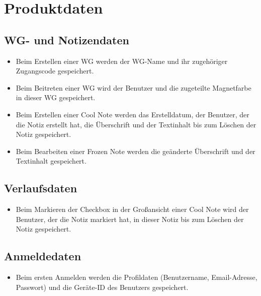 \documentclass[a4paper]{scrreprt}
\begin{document}
    \chapter{Produktdaten}
        \section{WG- und Notizendaten}
        \begin{itemize}
        \item Beim Erstellen einer WG werden der WG-Name und ihr zugehöriger Zugangscode gespeichert.
		\item Beim Beitreten einer WG wird der Benutzer und die zugeteilte Magnetfarbe in dieser WG gespeichert.
		\item Beim Erstellen einer Cool Note werden das Erstelldatum, der Benutzer, der die Notiz erstellt hat, die Überschrift und der Textinhalt bis zum Löschen der Notiz gespeichert.
		\item Beim Bearbeiten einer Frozen Note werden die geänderte Überschrift und der Textinhalt gespeichert.
        \end{itemize}
       
		\section{Verlaufsdaten}
		\begin{itemize}
		\item Beim Markieren der Checkbox in der Großansicht einer Cool Note wird der Benutzer, der die Notiz markiert hat, in dieser Notiz bis zum Löschen der Notiz gespeichert.
		\end{itemize}
        
        \section{Anmeldedaten}
        \begin{itemize}
        \item Beim ersten Anmelden werden die Profildaten (Benutzername, Email-Adresse, Passwort) und die Geräte-ID des Benutzers gespeichert.
        \end{itemize}
\end{document}
